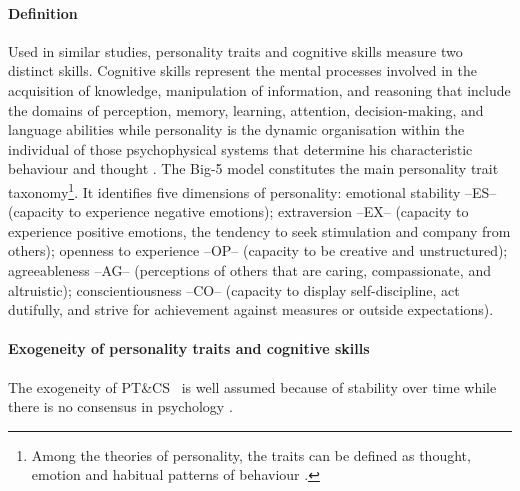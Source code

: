 \documentclass[a4paper, 12pt, onecolumn]{article}
\newcommand{\PTCS}{PT\&CS}
\begin{document}
\paragraph{Definition}
Used in similar studies, personality traits and cognitive skills measure two distinct skills.
Cognitive skills represent the mental processes involved in the acquisition of knowledge, manipulation of information, and reasoning that include the domains of perception, memory, learning, attention, decision-making, and language abilities \citep{Kiely2014} while personality is the dynamic organisation within the individual of those psychophysical systems that determine his characteristic behaviour and thought \citep{Allport1961}.
The Big-5 model constitutes the main personality trait taxonomy\footnote{Among the theories of personality, the traits can be defined as thought, emotion and habitual patterns of behaviour \citep{Kassin2003}.}.
It identifies five dimensions of personality: emotional stability --ES-- (capacity to experience negative emotions); extraversion --EX-- (capacity to experience positive emotions, the tendency to seek stimulation and company from others); openness to experience --OP-- (capacity to be creative and unstructured); agreeableness --AG-- (perceptions of others that are caring, compassionate, and altruistic); conscientiousness --CO-- (capacity to display self-discipline, act dutifully, and strive for achievement against measures or outside expectations).	



\paragraph{Exogeneity of personality traits and cognitive skills}
The exogeneity of \PTCS~ is well assumed because of stability over time while there is no consensus in psychology \citep{Ardelt2000, Deary2014}.
\end{document}

